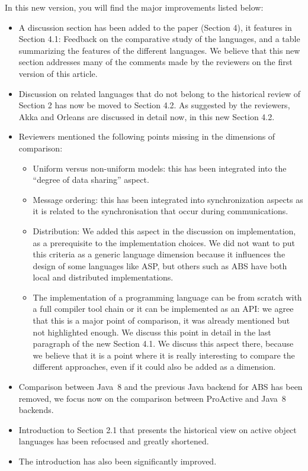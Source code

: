 \documentclass{article}
\begin{document}
In this new version, you will find the major improvements listed below:
\begin{itemize}
\item A discussion section has been added to the paper (Section 4), it features in 
Section 4.1: Feedback on the 
comparative study of the languages, and a table summarizing the features of the different 
languages. We believe that this new section addresses many of the comments made by the 
reviewers on the first version of this article.
\item Discussion on  related languages that do not belong to the historical review of 
Section 2 has 
now be moved to Section 4.2. As suggested by the reviewers, Akka and Orleans are 
discussed in detail now, in this new Section 4.2.
\item Reviewers mentioned the following points missing in the dimensions of comparison: 
\begin{itemize}
\item Uniform versus non-uniform models: this has been integrated into
  the ``degree of data sharing'' aspect.
\item Message ordering: this has been integrated into synchronization
  aspects as it is related to the synchronisation that occur during
  communications.
\item Distribution: We added this aspect in the discussion on
  implementation, as a prerequisite to the implementation choices. We
  did not want to put this criteria as a generic language dimension
  because it influences the design of some languages like ASP, but
  others such as ABS have both local and distributed implementations.
\item The implementation of a programming language can be from scratch
  with a full compiler tool chain or it can be implemented as an API:
  we agree that this is a major point of comparison, it was already
  mentioned but not highlighted enough. We discuss this point in
  detail in the last paragraph of the new Section 4.1. We discuss this
  aspect there, because we believe that it is a point where it is
  really interesting to compare the different approaches, even if it
  could also be added as a dimension.
\end{itemize}

\item Comparison between Java~8 and the previous Java backend for ABS
  has been removed, we focus now on the comparison between ProActive
  and Java~8 backends.
\end{itemize}
\begin{itemize}
\item Introduction to Section 2.1 that presents the historical view on
  active object languages has been refocused and greatly shortened.
\item The introduction has also been significantly improved.
\end{itemize}
\end{document}
